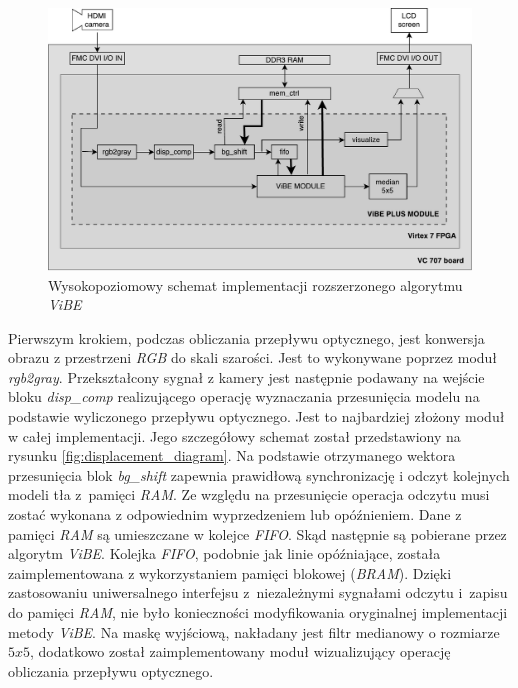 	\begin{figure}[h!]
		\centering
		\includegraphics[scale=0.6]{img/4/vibe_plus.pdf}
		\caption{Wysokopoziomowy schemat implementacji rozszerzonego algorytmu \textit{ViBE}}
		\label{fig:vibe_plus_diagram}
	\end{figure}

Pierwszym krokiem, podczas obliczania przepływu optycznego, jest konwersja obrazu z przestrzeni \textit{RGB} do skali szarości. 
Jest to wykonywane poprzez moduł \textit{rgb2gray}. 
Przekształcony sygnał z kamery jest następnie podawany na wejście bloku \textit{disp\_comp} realizującego operację wyznaczania przesunięcia modelu na podstawie wyliczonego przepływu optycznego. 
Jest to najbardziej złożony moduł w całej implementacji. 
Jego szczegółowy schemat został przedstawiony na rysunku \ref{fig:displacement_diagram}. 
Na podstawie otrzymanego wektora przesunięcia blok \textit{bg\_shift} zapewnia prawidłową synchronizację i odczyt kolejnych modeli tła z~pamięci \textit{RAM}. 
Ze względu na przesunięcie operacja odczytu musi zostać wykonana z odpowiednim wyprzedzeniem lub opóźnieniem. 
Dane z pamięci \textit{RAM} są umieszczane w kolejce \textit{FIFO}.
Skąd następnie są pobierane przez algorytm \textit{ViBE}. 
Kolejka \textit{FIFO}, podobnie jak linie opóźniające, została zaimplementowana z wykorzystaniem pamięci blokowej (\textit{BRAM}). 
Dzięki zastosowaniu uniwersalnego interfejsu z~niezależnymi sygnałami odczytu i~zapisu do pamięci \textit{RAM}, nie było konieczności modyfikowania oryginalnej implementacji metody \textit{ViBE}. 
Na maskę wyjściową, nakładany jest filtr medianowy o rozmiarze $5x5$, dodatkowo został zaimplementowany moduł wizualizujący operację obliczania przepływu optycznego.

